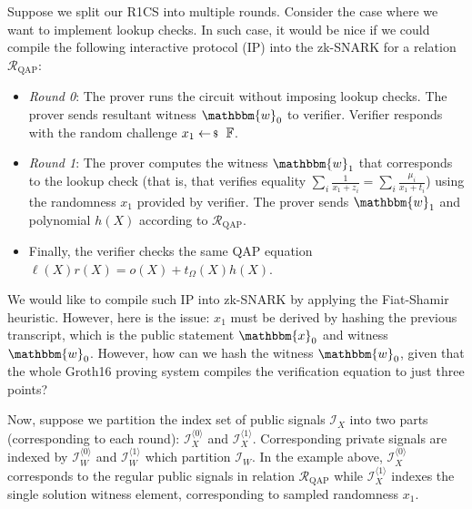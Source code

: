Suppose we split our R1CS into multiple rounds. Consider the case where we want
to implement lookup checks. In such case, it would be nice if we could compile
the following interactive protocol (IP) into the zk-SNARK for a relation
$\mathcal{R}_{\text{QAP}}$:
\begin{itemize}
    \item \textit{Round 0}: The prover runs the circuit without imposing lookup
    checks. The prover sends resultant witness $\mathbbm{w}_0$ to verifier.
    Verifier responds with the random challenge $x_1 \leftarrowS \mathbb{F}$.
    \item \textit{Round 1}: The prover computes the witness $\mathbbm{w}_1$ that
    corresponds to the lookup check (that is, that verifies equality $\sum_{i}
    \frac{1}{x_1+z_i}=\sum_i \frac{\mu_i}{x_1+t_i}$) using the randomness $x_1$
    provided by verifier. The prover sends $\mathbbm{w}_1$ and polynomial $h(X)$
    according to $\mathcal{R}_{\text{QAP}}$.
    \item Finally, the verifier checks the same QAP equation
    $\ell(X)r(X)=o(X)+t_{\Omega}(X)h(X)$.
\end{itemize}

We would like to compile such IP into zk-SNARK by applying the Fiat-Shamir
heuristic. However, here is the issue: $x_1$ must be derived by hashing the
previous transcript, which is the public statement $\mathbbm{x}_0$ and witness
$\mathbbm{w}_0$. However, how can we hash the witness $\mathbbm{w}_0$, given that
the whole Groth16 proving system compiles the verification equation to just
three points?

Now, suppose we partition the index set of public signals $\mathcal{I}_X$ into
two parts (corresponding to each round): $\mathcal{I}_X^{\langle 0 \rangle}$ and
$\mathcal{I}_X^{\langle 1 \rangle}$. Corresponding private signals are indexed
by $\mathcal{I}_W^{\langle 0 \rangle}$ and $\mathcal{I}_W^{\langle 1 \rangle}$
which partition $\mathcal{I}_W$. In the example above, $\mathcal{I}_X^{\langle 0
\rangle}$ corresponds to the regular public signals in relation
$\mathcal{R}_{\text{QAP}}$ while $\mathcal{I}_X^{\langle 1 \rangle}$ indexes the
single solution witness element, corresponding to sampled randomness $x_1$.

